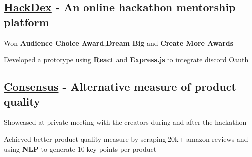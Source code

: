


\subsection{\href{https://devpost.com/software/hackdex}{HackDex} - An online hackathon mentorship platform}
\begin{zitemize}
\item Won \textbf{Audience Choice Award},\textbf{Dream Big} and \textbf{Create More Awards}
\item Developed a prototype using \textbf{React} and \textbf{Express.js} to integrate discord Oauth
\end{zitemize}

\vspace{0.3cm}\subsection{\href{https://devpost.com/software/consensus-qlc9n6}{Consensus} - Alternative measure of product quality}
\begin{zitemize}
\item Showcased at private meeting with the creators during and after the hackathon
\item Achieved better product quality measure by scraping 20k+ amazon reviews and using \textbf{NLP} to generate 10 key points per product
\end{zitemize}


